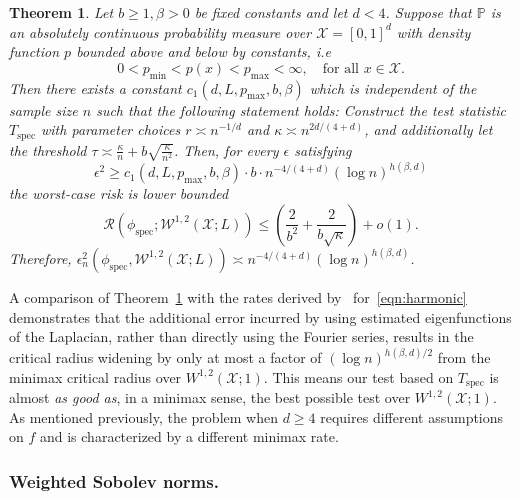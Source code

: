 \documentclass{article}
\newcommand{\1}{\mathbf{1}}
\newcommand{\Pbb}{\mathbb{P}}
\theoremstyle{alden}
\theoremstyle{aldenthm}
\newtheorem{theorem}{Theorem}
\theoremstyle{definition}
\theoremstyle{remark}
\begin{document}
\begin{theorem}
	\label{thm:sobolev_testing_rate}
	Let $b \geq 1,\beta > 0$ be fixed constants and let $d < 4$. Suppose that $\Pbb$ is an absolutely continuous probability measure over $\mathcal{X} = [0,1]^d$ with density function $p$ bounded above and below by constants, i.e
	\begin{equation*}
	0 < p_{\textrm{min}} < p(x) < p_{\textrm{max}} < \infty, \quad \textrm{for all $x \in \mathcal{X}$.}
	\end{equation*}
	Then there exists a constant $c_1(d,L,p_{\max},b,\beta)$ which is independent of the sample size $n$ such that the following statement holds: Construct the test statistic $T_{\mathrm{spec}}$ with parameter choices $r \asymp n^{-1/d}$ and $\kappa \asymp n^{2d/(4+d)}$, and additionally let the threshold $\tau \asymp \frac{\kappa}{n} + b\sqrt{\frac{\kappa}{n^2}}$. Then, for every $\epsilon$ satisfying
	\begin{equation}
	\label{eqn:sobolev_testing_rate}
	\epsilon^2 \geq c_1(d,L,p_{\max},b,\beta) \cdot b \cdot n^{-4/(4 + d)} (\log n)^{h(\beta,d)}
	\end{equation}
	the worst-case risk is lower bounded
	\begin{equation}
	\label{eqn:sobolev_testing_rate_1}
	\mathcal{R}(\phi_{\mathrm{spec}}; \mathcal{W}^{1,2}(\mathcal{X};L)) \leq \left(\frac{2}{b^2} + \frac{2}{b\sqrt{\kappa}}\right) + o(1).
	\end{equation}
	Therefore, $\epsilon_n^2(\phi_{\mathrm{spec}}, \mathcal{W}^{1,2}(\mathcal{X};L)) \asymp  n^{-4/(4 + d)} (\log n)^{h(\beta,d)}$. 
\end{theorem}

A comparison of Theorem~\ref{thm:sobolev_testing_rate} with the rates derived by~\citet{ingster09} for~\eqref{eqn:harmonic} demonstrates that the additional error incurred by using estimated eigenfunctions of the Laplacian, rather than directly using the Fourier series, results in the critical radius widening by only at most a factor of $(\log n)^{h(\beta,d)/2}$ from the minimax critical radius over $W^{1,2}(\mathcal{X};1)$. This means our test based on $T_{\textrm{spec}}$ is almost \textit{as good as}, in a minimax sense, the best possible test over $W^{1,2}(\mathcal{X};1)$. As mentioned previously, the problem when $d \geq 4$ requires different assumptions on $f$ and is characterized by a different minimax rate.

\subsubsection{Weighted Sobolev norms.}
\end{document}
